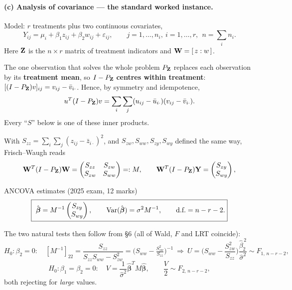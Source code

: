 \documentclass[11pt]{article}
\begin{document}
\paragraph{(c) Analysis of covariance --- the standard worked instance.}
Model: $r$ treatments plus two continuous covariates,
\[
  Y_{ij}=\mu_i+\beta_1z_{ij}+\beta_2w_{ij}+\varepsilon_{ij},
  \qquad j=1,\dots,n_i,\ i=1,\dots,r,\ \ n=\textstyle\sum_i n_i .
\]
Here $\mathbf{Z}$ is the $n\times r$ matrix of treatment indicators and $\mathbf{W}=[\,z:w\,]$.

\begin{recipe}{The one observation that solves the whole problem}
$P_{\mathbf{Z}}$ replaces each observation by its \textbf{treatment mean}, so $I-P_{\mathbf{Z}}$ \textbf{centres
within treatment}: $[(I-P_{\mathbf{Z}})v]_{ij}=v_{ij}-\bar v_{i\cdot}$. Hence, by symmetry and
idempotence,
\[
  u^T(I-P_{\mathbf{Z}})v=\sum_i\sum_j(u_{ij}-\bar u_{i\cdot})(v_{ij}-\bar v_{i\cdot}).
\]
Every ``$S$'' below is one of these inner products.
\end{recipe}

With $S_{zz}=\sum_i\sum_j(z_{ij}-\bar z_{i\cdot})^2$, and $S_{zw},S_{ww},S_{zy},S_{wy}$
defined the same way, Frisch--Waugh reads
\[
  \mathbf{W}^T(I-P_{\mathbf{Z}})\mathbf{W}=\begin{pmatrix}S_{zz}&S_{zw}\\S_{zw}&S_{ww}\end{pmatrix}=:M,
  \qquad
  \mathbf{W}^T(I-P_{\mathbf{Z}})\mathbf{Y}=\begin{pmatrix}S_{zy}\\S_{wy}\end{pmatrix},
\]
\begin{idea}{ANCOVA estimates (2025 exam, 12 marks)}
\[
  \boxed{\ \hat{\boldsymbol\beta}=M^{-1}\begin{pmatrix}S_{zy}\\S_{wy}\end{pmatrix},
  \qquad \Var(\hat{\boldsymbol\beta})=\sigma^2M^{-1},
  \qquad \text{d.f.}=n-r-2 . }
\]
\end{idea}

The two natural tests then follow from \S6 (all of Wald, $F$ and LRT coincide):
\[
  H_0:\beta_2=0:\quad
  [M^{-1}]_{22}=\frac{S_{zz}}{S_{zz}S_{ww}-S_{zw}^2}=\Big(S_{ww}-\tfrac{S_{zw}^2}{S_{zz}}\Big)^{-1}
  \ \Longrightarrow\
  U=\Big(S_{ww}-\frac{S_{zw}^2}{S_{zz}}\Big)\frac{\hat\beta_2^{\,2}}{\hat\sigma^2}\sim F_{1,\,n-r-2},
\]
\[
  H_0:\beta_1=\beta_2=0:\quad
  V=\frac{1}{\hat\sigma^2}\hat{\boldsymbol\beta}^TM\hat{\boldsymbol\beta},
  \qquad \frac{V}{2}\sim F_{2,\,n-r-2},
\]
both rejecting for \emph{large} values.
\end{document}
